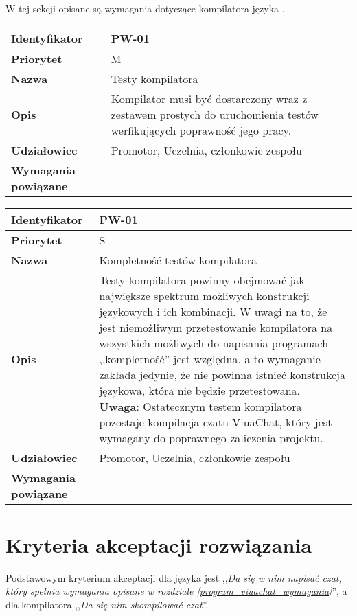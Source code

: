 W tej sekcji opisane są wymagania dotyczące kompilatora języka \ViuAct.

\vspace{1em}

\begin{tabular}{ | l | l | }
    \hline
    \textbf{Identyfikator} & \parbox[t]{11cm}{PW-01} \\
    \hline
    \textbf{Priorytet} & M \\
    \hline
    \textbf{Nazwa} & Testy kompilatora \\
    \hline
    \textbf{Opis} & \parbox[t]{11cm}{
        Kompilator musi być dostarczony wraz z zestawem prostych do uruchomienia testów werfikujących
        poprawność jego pracy.
    } \\
    \hline
    \textbf{Udziałowiec} & Promotor, Uczelnia, członkowie zespołu \\
    \hline
    \textbf{Wymagania powiązane} & \phantom{} \\
    \hline
\end{tabular}

\vspace{1em}

\begin{tabular}{ | l | l | }
    \hline
    \textbf{Identyfikator} & \parbox[t]{11cm}{PW-01} \\
    \hline
    \textbf{Priorytet} & S \\
    \hline
    \textbf{Nazwa} & Kompletność testów kompilatora \\
    \hline
    \textbf{Opis} & \parbox[t]{11cm}{
        Testy kompilatora powinny obejmować jak największe spektrum możliwych konstrukcji językowych i
        ich kombinacji. W uwagi na to, że jest niemożliwym przetestowanie kompilatora na wszystkich
        możliwych do napisania programach ,,kompletność'' jest względna, a to wymaganie zakłada jedynie, że
        nie powinna istnieć konstrukcja językowa, która nie będzie przetestowana. \\
        \textbf{Uwaga}: Ostatecznym testem kompilatora pozostaje kompilacja czatu ViuaChat, który jest
        wymagany do poprawnego zaliczenia projektu.
    } \\
    \hline
    \textbf{Udziałowiec} & Promotor, Uczelnia, członkowie zespołu \\
    \hline
    \textbf{Wymagania powiązane} & \phantom{} \\
    \hline
\end{tabular}

\section{Kryteria akceptacji rozwiązania}

Podstawowym kryterium akceptacji dla języka jest
,,\emph{Da się w nim napisać czat, który spełnia wymagania opisane w
rozdziale \ref{program_viuachat_wymagania}}'',
a dla kompilatora ,,\emph{Da się nim skompilować czat}''.
